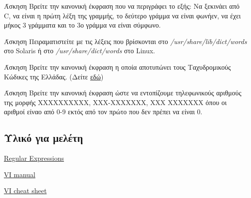 \begin{exercisebox}{  Άσκηση}
Βρείτε την κανονική έκφραση που να περιγράφει το εξής: Να ξεκινάει από C, να είναι η πρώτη λέξη της γραμμής, το δεύτερο γράμμα να είναι φωνήεν, να έχει μήκος 3 γράμματα και το 3ο γράμμα να είναι σύμφωνο.
\end{exercisebox}




\begin{exercisebox}{ Άσκηση}
Πειραματιστείτε με τις λέξεις που βρίσκονται στο \emph{/usr/share/lib/dict/words} στο Solaris ή στο \emph{/usr/share/dict/words} στο Linux.
\end{exercisebox}



\begin{exercisebox}{ Άσκηση}
Βρείτε την κανονική έκφραση η οποία αποτυπώνει τους Ταχυδρομικούς Κώδικες της Ελλάδας. (Δείτε \href{http://goo.gl/TRZqdu}{εδώ})
\end{exercisebox}


\begin{exercisebox}{ Άσκηση}
Βρείτε την κανονική έκφραση ώστε να εντοπίζουμε τηλεφωνικούς αριθμούς της μορφής ΧΧΧΧΧΧΧΧΧΧ, ΧΧΧ-ΧΧΧΧΧΧΧ, ΧΧΧ ΧΧΧΧΧΧΧ όπου οι αριθμοί είναο από 0-9 εκτός από τον πρώτο που δεν πρέπει να είναι 0.
\end{exercisebox}

\subsection{Υλικό για μελέτη}
\begin{packed_item}
	\item \href{http://www.grymoire.com/Unix/Regular.html}{Regular Expressions}
	\item \href{http://www.netads.com/~meo/useful/vi/vi.rm.html}{VI manual}
	\item \href{http://ryanstutorials.net/linuxtutorial/cheatsheetvi.php}{VI cheat sheet}
\end{packed_item}



